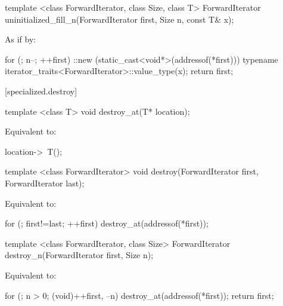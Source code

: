 %
\begin{itemdecl}
template <class ForwardIterator, class Size, class T>
  ForwardIterator uninitialized_fill_n(ForwardIterator first, Size n, const T& x);
\end{itemdecl}

\begin{itemdescr}
\pnum
\effects
As if by:
\begin{codeblock}
for (; n--; ++first)
  ::new (static_cast<void*>(addressof(*first)))
    typename iterator_traits<ForwardIterator>::value_type(x);
return first;
\end{codeblock}
\end{itemdescr}

[specialized.destroy]{}

%
\begin{itemdecl}
template <class T>
  void destroy_at(T* location);
\end{itemdecl}

\begin{itemdescr}
\pnum
\effects
Equivalent to:
\begin{codeblock}
location->~T();
\end{codeblock}
\end{itemdescr}

%
\begin{itemdecl}
template <class ForwardIterator>
  void destroy(ForwardIterator first, ForwardIterator last);
\end{itemdecl}

\begin{itemdescr}
\pnum
\effects
Equivalent to:
\begin{codeblock}
for (; first!=last; ++first)
  destroy_at(addressof(*first));
\end{codeblock}
\end{itemdescr}

%
\begin{itemdecl}
template <class ForwardIterator, class Size>
  ForwardIterator destroy_n(ForwardIterator first, Size n);
\end{itemdecl}

\begin{itemdescr}
\pnum
\effects
Equivalent to:
\begin{codeblock}
for (; n > 0; (void)++first, --n)
  destroy_at(addressof(*first));
return first;
\end{codeblock}
\end{itemdescr}

